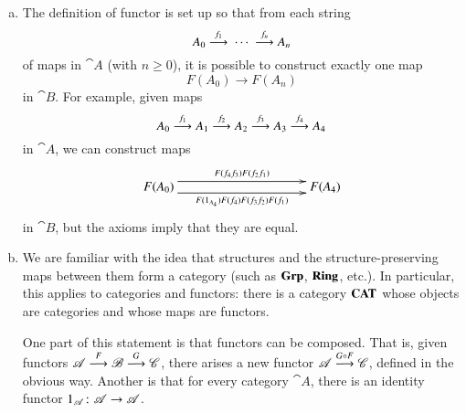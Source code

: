 \begin{remarks} 
\label{rmks:defn-ftr}
\begin{enumerate}[(b)]       
\item 
\label{rmk:defn-ftr:loosely}
The definition of functor is set up so that from each string
\[
A_0 \toby{f_1} \ \cdots\ \toby{f_n} A_n
\]
of maps in $\cat{A}$ (with $n \geq 0$), it is possible to construct exactly
one%
%
%
map
\[
F(A_0) \to F(A_n)
\]
in $\cat{B}$.  For example, given maps
\[
A_0 \stackrel{f_1}{\longrightarrow} A_1 \stackrel{f_2}{\longrightarrow} A_2 \stackrel{f_3}{\longrightarrow} A_3 \stackrel{f_4}{\longrightarrow} A_4
\]
in $\cat{A}$, we can construct maps
\[
\xymatrix@=10em{
F(A_0) 
\ar@<1ex>[r]^{F(f_4 f_3) F(f_2 f_1)}
\ar@<-1ex>[r]_{F(1_{A_4}) F(f_4) F(f_3 f_2) F(f_1)}     &
F(A_4)
}
\]
in $\cat{B}$, but the axioms imply that they are equal.  

\item   
\label{rmk:defn-ftr:comp}
We are familiar with the idea that structures and the structure-preserving
maps between them form a category (such as $\mathbf{Grp}$, $\mathbf{Ring}$, etc.).  In
particular, this applies to categories and functors: there is a category
$\mathbf{CAT}$%
%
%
%
whose objects are categories and whose maps are functors.

One part of this statement is that functors can be composed.%
%
%
That is, given functors $\mathscr{A} \stackrel{F}{\longrightarrow} \mathscr{B} \stackrel{G}{\longrightarrow} \mathscr{C}$, there
arises a new functor $\mathscr{A} \stackrel{G \mathbin{\circ} F}{\longrightarrow} \mathscr{C}$,%
%
%
defined in the obvious way.  Another is that for every category $\cat{A}$,
there is an identity%
%
%
functor $1_\cat{A}\from \cat{A} \to \cat{A}$.%
%
%
\end{enumerate}
\end{remarks}

